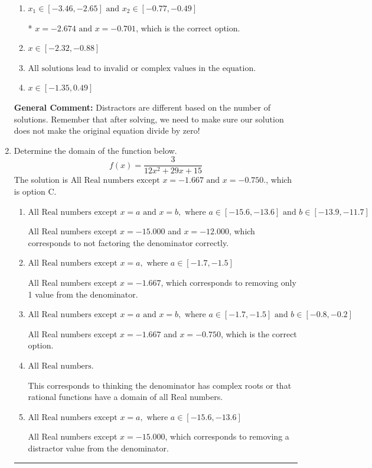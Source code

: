 \documentclass{extbook}[14pt]
\newcommand{\litem}[1]{\item #1

\rule{\textwidth}{0.4pt}}
\begin{document}
\begin{enumerate}
{\begin{enumerate}[label=\Alph*.]
\item \( x_1 \in [-3.46, -2.65] \text{ and } x_2 \in [-0.77,-0.49] \)

* $x = -2.674 \text{ and } x = -0.701$, which is the correct option.
\item \( x \in [-2.32,-0.88] \)


\item \( \text{All solutions lead to invalid or complex values in the equation.} \)


\item \( x \in [-1.35,0.49] \)


\end{enumerate}

\textbf{General Comment:} Distractors are different based on the number of solutions. Remember that after solving, we need to make sure our solution does not make the original equation divide by zero!
}
\litem{
Determine the domain of the function below.
\[ f(x) = \frac{3}{12x^{2} +29 x + 15} \]The solution is \( \text{All Real numbers except } x = -1.667 \text{ and } x = -0.750. \), which is option C.\begin{enumerate}[label=\Alph*.]
\item \( \text{All Real numbers except } x = a \text{ and } x = b, \text{ where } a \in [-15.6, -13.6] \text{ and } b \in [-13.9, -11.7] \)

All Real numbers except $x = -15.000$ and $x = -12.000$, which corresponds to not factoring the denominator correctly.
\item \( \text{All Real numbers except } x = a, \text{ where } a \in [-1.7, -1.5] \)

All Real numbers except $x = -1.667$, which corresponds to removing only 1 value from the denominator.
\item \( \text{All Real numbers except } x = a \text{ and } x = b, \text{ where } a \in [-1.7, -1.5] \text{ and } b \in [-0.8, -0.2] \)

All Real numbers except $x = -1.667$ and $x = -0.750$, which is the correct option.
\item \( \text{All Real numbers.} \)

This corresponds to thinking the denominator has complex roots or that rational functions have a domain of all Real numbers.
\item \( \text{All Real numbers except } x = a, \text{ where } a \in [-15.6, -13.6] \)

All Real numbers except $x = -15.000$, which corresponds to removing a distractor value from the denominator.
\end{enumerate}

}
\end{enumerate}
\end{document}
